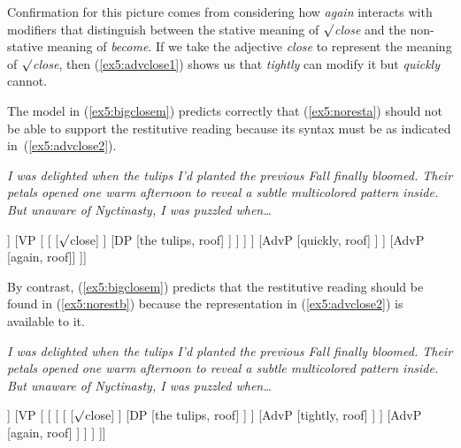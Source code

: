 Confirmation for this picture comes from considering how \emph{again} interacts with modifiers that distinguish between the stative meaning of \emph{$\surd$close} and the non-stative meaning of \emph{become}. If we take the adjective \emph{close} to represent the meaning of \emph{$\surd$close}, then (\ref{ex5:advclose1}) shows us that \emph{tightly} can modify it but \emph{quickly} cannot.
\begin{exe}
	\raggedright
	\ex \label{ex5:advclose1} 
	\begin{xlist}
	\end{xlist}
\end{exe}
The model in (\ref{ex5:bigclosem}) predicts correctly that (\ref{ex5:noresta}) should not be able to support the restitutive reading because its syntax must be as indicated in~(\ref{ex5:advclose2}).
\begin{exe}
	\raggedright
	\sn \emph{I was delighted when the tulips I'd planted the previous Fall finally bloomed. Their petals opened one warm afternoon to reveal a subtle multicolored pattern inside. But unaware of Nyctinasty, I was puzzled when\ldots}
	\ex \label{ex5:advclose2}
	\small
	\begin{forest}
	[VP[\ibar{V}
		[\ibar{V} 
			[\ibar{V}
				[\obar{V} [become] ]
				[VP [
					[ ]
					[DP [the tulips, roof] ]
				] ]
			 ]
			[AdvP [quickly, roof] ]
		]
		[AdvP [again, roof]]
	]]
	\end{forest}
\end{exe}
By contrast, (\ref{ex5:bigclosem}) predicts that the restitutive reading should be found in (\ref{ex5:norestb}) because the representation in (\ref{ex5:advclose2}) is available to it.
\begin{exe}
	\raggedright
	\sn \emph{I was delighted when the tulips I'd planted the previous Fall finally bloomed. Their petals opened one warm afternoon to reveal a subtle multicolored pattern inside. But unaware of Nyctinasty, I was puzzled when\ldots}
	\ex \label{ex5:advclose3}
	\small
	\begin{forest}
	[VP[\ibar{V}
		[\obar{V} [become] ]
		[VP [
			[
				[
					[ ]
					[DP [the tulips, roof] ]
				 ]
				[AdvP [tightly, roof] ]
			 ]
			[AdvP [again, roof] ]
		] ]
	]]
	\end{forest}
\end{exe}

